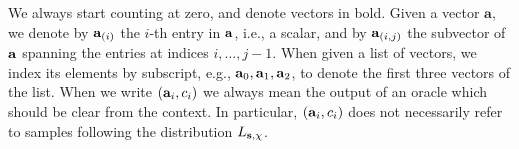  We always start counting at zero, and denote vectors in bold. Given a vector $\mathbf{a}$, we denote by $\mathbf{a}_{(i)}$ the $i$-th entry in $\mathbf{a}$, i.e., a scalar, and by $\mathbf{a}_{(i,j)}$ the subvector of $\mathbf{a}$ spanning the entries at indices $i,\dots,j-1$. When given a list of vectors, we index its elements by subscript, e.g., $\mathbf{a}_0,\mathbf{a}_1, \mathbf{a}_2$, to denote the first three vectors of the list.
When we write $(\mathbf{a}_i,c_i)$ we always mean the output of an oracle which should be clear from the context. In particular, $(\mathbf{a}_i,c_i)$ does not necessarily refer to samples following the distribution $L_{\mathbf{s},\chi}$.
